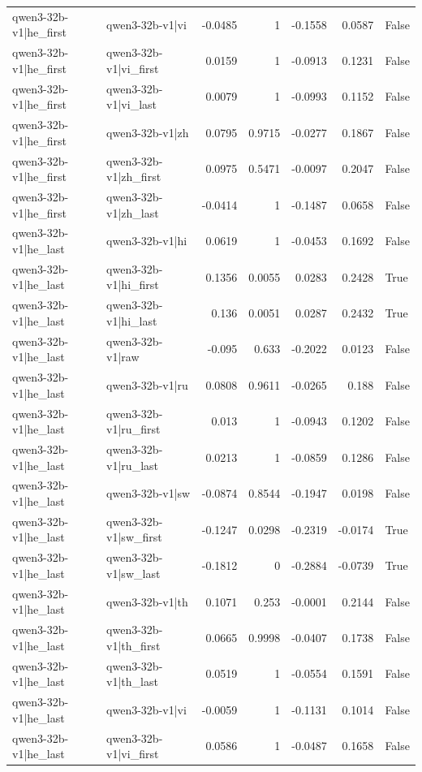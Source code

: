 \begin{table}
\begin{tabular}{l l r r r r l}
qwen3-32b-v1|he_first & qwen3-32b-v1|vi & -0.0485 & 1 & -0.1558 & 0.0587 & False \\
qwen3-32b-v1|he_first & qwen3-32b-v1|vi_first & 0.0159 & 1 & -0.0913 & 0.1231 & False \\
qwen3-32b-v1|he_first & qwen3-32b-v1|vi_last & 0.0079 & 1 & -0.0993 & 0.1152 & False \\
qwen3-32b-v1|he_first & qwen3-32b-v1|zh & 0.0795 & 0.9715 & -0.0277 & 0.1867 & False \\
qwen3-32b-v1|he_first & qwen3-32b-v1|zh_first & 0.0975 & 0.5471 & -0.0097 & 0.2047 & False \\
qwen3-32b-v1|he_first & qwen3-32b-v1|zh_last & -0.0414 & 1 & -0.1487 & 0.0658 & False \\
qwen3-32b-v1|he_last & qwen3-32b-v1|hi & 0.0619 & 1 & -0.0453 & 0.1692 & False \\
qwen3-32b-v1|he_last & qwen3-32b-v1|hi_first & 0.1356 & 0.0055 & 0.0283 & 0.2428 & True \\
qwen3-32b-v1|he_last & qwen3-32b-v1|hi_last & 0.136 & 0.0051 & 0.0287 & 0.2432 & True \\
qwen3-32b-v1|he_last & qwen3-32b-v1|raw & -0.095 & 0.633 & -0.2022 & 0.0123 & False \\
qwen3-32b-v1|he_last & qwen3-32b-v1|ru & 0.0808 & 0.9611 & -0.0265 & 0.188 & False \\
qwen3-32b-v1|he_last & qwen3-32b-v1|ru_first & 0.013 & 1 & -0.0943 & 0.1202 & False \\
qwen3-32b-v1|he_last & qwen3-32b-v1|ru_last & 0.0213 & 1 & -0.0859 & 0.1286 & False \\
qwen3-32b-v1|he_last & qwen3-32b-v1|sw & -0.0874 & 0.8544 & -0.1947 & 0.0198 & False \\
qwen3-32b-v1|he_last & qwen3-32b-v1|sw_first & -0.1247 & 0.0298 & -0.2319 & -0.0174 & True \\
qwen3-32b-v1|he_last & qwen3-32b-v1|sw_last & -0.1812 & 0 & -0.2884 & -0.0739 & True \\
qwen3-32b-v1|he_last & qwen3-32b-v1|th & 0.1071 & 0.253 & -0.0001 & 0.2144 & False \\
qwen3-32b-v1|he_last & qwen3-32b-v1|th_first & 0.0665 & 0.9998 & -0.0407 & 0.1738 & False \\
qwen3-32b-v1|he_last & qwen3-32b-v1|th_last & 0.0519 & 1 & -0.0554 & 0.1591 & False \\
qwen3-32b-v1|he_last & qwen3-32b-v1|vi & -0.0059 & 1 & -0.1131 & 0.1014 & False \\
qwen3-32b-v1|he_last & qwen3-32b-v1|vi_first & 0.0586 & 1 & -0.0487 & 0.1658 & False \\

\end{tabular}
\end{table}

